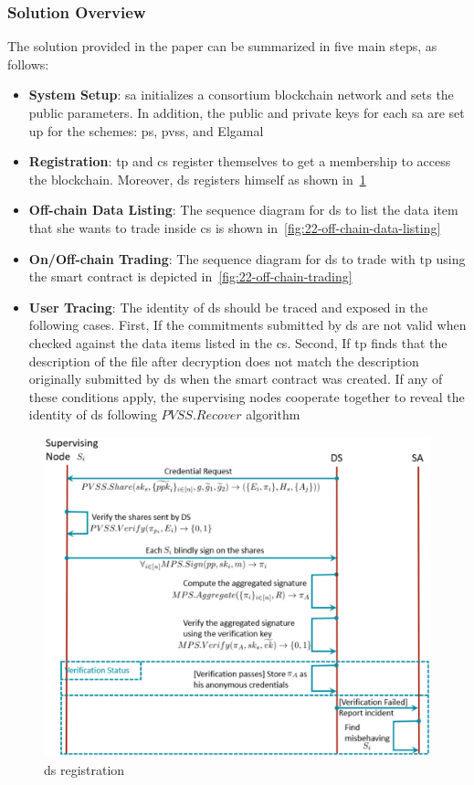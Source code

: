 \subsubsection{Solution Overview}
The solution provided in the paper can be summarized in five main steps, as follows:

\begin{itemize}
    \item \textbf{System Setup}: \ac{sa} initializes a consortium blockchain network and sets the public parameters. 
    In addition, the public and private keys for each \ac{sa} are set up for the schemes: \ac{ps}, \ac{pvss}, and Elgamal
    \item \textbf{Registration}: \ac{tp} and \ac{cs} register themselves to get a membership to access the blockchain.
    Moreover, \ac{ds} registers himself as shown in~\cref{fig:22-ds-registration}
    \item \textbf{Off-chain Data Listing}: The sequence diagram for \ac{ds} to list the data item that she wants to trade inside \ac{cs} is shown in~\cref{fig:22-off-chain-data-listing}
    \item \textbf{On/Off-chain Trading}: The sequence diagram for \ac{ds} to trade with \ac{tp} using the smart contract is depicted in~\cref{fig:22-off-chain-trading}
    \item \textbf{User Tracing}: The identity of \ac{ds} should be traced and exposed in the following cases.
    First, If the commitments submitted by \ac{ds} are not valid when checked against the data items listed in the \ac{cs}.
    Second, If \ac{tp} finds that the description of the file after decryption does not match the description originally submitted by \ac{ds} when the smart contract was created.
    If any of these conditions apply, the supervising nodes cooperate together to reveal the identity of \ac{ds} following $PVSS.Recover$ algorithm
\end{itemize}

\begin{figure}
\centering
  \includegraphics[width=1\linewidth]{imgs/22-sequenceRegisterDs.eps}
  \caption{\ac{ds} registration}
  \label{fig:22-ds-registration}
\end{figure}

